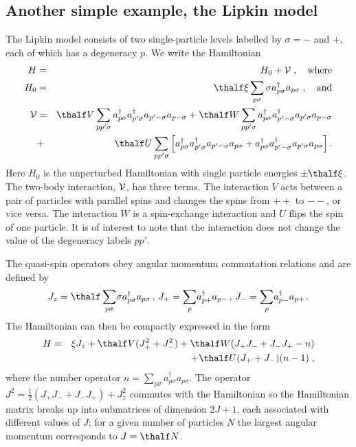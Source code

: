 \subsection{Another simple example, the Lipkin model}

The Lipkin model consists of two single-particle levels
labelled by $\sigma=-$ and $+$, each of which has a degeneracy $p$. We write
the Hamiltonian
\begin{eqnarray}
H&=& H_0+{\cal V}\;,\quad{\rm where}\nonumber\\
H_0&=&\thalf\xi\sum_{p\sigma}{\sigma}a_{p\sigma}^{\dagger}a_{p\sigma}\;,
\quad{\rm and}\nonumber\\
{\cal V}&=&\thalf V\sum_{pp'\sigma}a^{\dagger}_{p\sigma}
a^{\dagger}_{p'\sigma}a_{p'-\sigma}a_{p-\sigma}+ 
\thalf W\sum_{pp'\sigma}a^{\dagger}_{p\sigma}a_{p'-\sigma}^{\dagger}
a_{p'\sigma}a_{p-\sigma}  \nonumber\\
&+&\thalf U\sum_{pp'\sigma}\left[a^{\dagger}_{p\sigma}
a_{p'\sigma}^{\dagger}
a_{p'-\sigma}a_{p\sigma}+a^{\dagger}_{p\sigma}a_{p'-\sigma}^{\dagger}
a_{p'\sigma}a_{p\sigma}\right].\nonumber
\end{eqnarray}
Here $H_0$ is the unperturbed  Hamiltonian with single particle energies
$\pm\thalf\xi$. The two-body interaction, ${\cal V}$, has three terms. The
interaction $V$ acts between a pair of particles with parallel spins and
changes the spins from $++$ to $--$, or vice versa. The interaction $W$
is a spin-exchange interaction and $U$ flips the spin of one particle.
It is of interest to note that the interaction does not change the value of
the degeneracy labels $pp'$.

The
quasi-spin operators obey angular momentum commutation relations and are
defined by
\[
J_z=\thalf\sum_{p\sigma}\!{\sigma}a^{\dagger}_{p\sigma}a_{p\sigma}\,,\,
J_+=\sum_p\!a_{p+}^{\dagger}a_{p-}\,,\,J_-=\sum_p\!a_{p-}^{\dagger}a_{p+}\,.
\]
The Hamiltonian can then be compactly expressed in the form
\begin{eqnarray}
H&=&{\xi}J_z+\thalf V(J_+^2+J_-^2)+\thalf W(J_+J_-+J_-J_+-n)\nonumber\\
&&+\thalf U(J_++J_-)(n-1)\nonumber \;,
\end{eqnarray}
where the number operator $n=\sum_{p\sigma}a^{\dagger}_{p\sigma}a_{p\sigma}$.
The operator $J^2=\frac{1}{2}(J_+J_-+J_-J_+)+J_z^2$ commutes with the
Hamiltonian so the Hamiltonian matrix breaks up into
submatrices of dimension $2J+1$, each associated with different values of
$J$; for a given number of particles $N$ the largest angular momentum
corresponds to $J=\thalf N$. 

